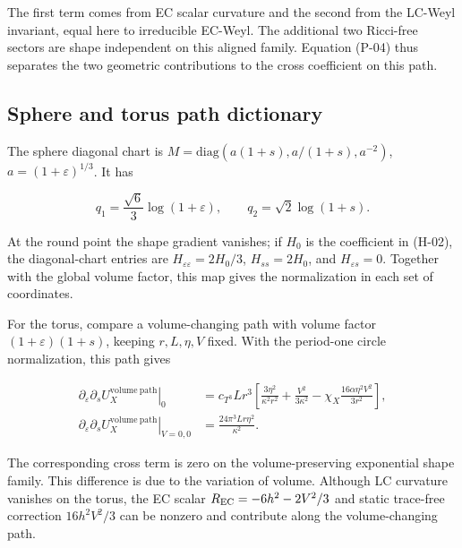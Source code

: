 The first term comes from EC scalar curvature and the second from the LC-Weyl invariant, equal here to irreducible EC-Weyl. The additional two Ricci-free sectors are shape independent on this aligned family. Equation (P-04) thus separates the two geometric contributions to the cross coefficient on this path.

\subsection{Sphere and torus path dictionary}

The sphere diagonal chart is $M=\mathrm{diag}(a(1+s),a/(1+s),a^{-2})$, $a=(1+\varepsilon)^{1/3}$. It has

\begin{equation}\tag{P-05}\label{eq:P-05}
q_1=\frac{\sqrt6}{3}\log(1+\varepsilon),\qquad
q_2=\sqrt2\log(1+s).
\end{equation}

At the round point the shape gradient vanishes; if $H_0$ is the coefficient in (H-02), the diagonal-chart entries are $H_{\varepsilon\varepsilon}=2H_0/3$, $H_{ss}=2H_0$, and $H_{\varepsilon s}=0$. Together with the global volume factor, this map gives the normalization in each set of coordinates.

For the torus, compare a volume-changing path with volume factor $(1+\varepsilon)(1+s)$, keeping $r,L,\eta,V$ fixed. With the period-one circle normalization, this path gives

\begin{equation}\tag{P-06}\label{eq:P-06}
\begin{aligned}
\left.\partial_\varepsilon\partial_sU_X^{\mathrm{volume\ path}}\right|_0
&=c_{T^3}Lr^3\left[\frac{3\eta^2}{\kappa^2r^2}+\frac{V^2}{3\kappa^2}
-\chi_X\frac{16\alpha\eta^2V^2}{3r^2}\right],\\
\left.\partial_\varepsilon\partial_sU_X^{\mathrm{volume\ path}}\right|_{V=0,0}
&=\frac{24\pi^3Lr\eta^2}{\kappa^2}.
\end{aligned}
\end{equation}

The corresponding cross term is zero on the volume-preserving exponential shape family. This difference is due to the variation of volume. Although LC curvature vanishes on the torus, the EC scalar $R_{\rm EC}=-6h^2-2V^2/3$ and static trace-free correction $16h^2V^2/3$ can be nonzero and contribute along the volume-changing path.
